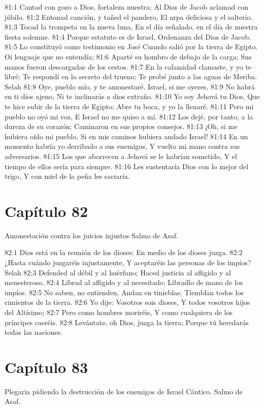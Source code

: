 81:1 Cantad con gozo a Dios, fortaleza nuestra; 
Al Dios de Jacob aclamad con júbilo. 
81:2 Entonad canción, y tañed el pandero, 
El arpa deliciosa y el salterio. 
81:3 Tocad la trompeta en la nueva luna, 
En el día señalado, en el día de nuestra fiesta solemne. 
81:4 Porque estatuto es de Israel, 
Ordenanza del Dios de Jacob. 
81:5 Lo constituyó como testimonio en José 
Cuando salió por la tierra de Egipto. 
Oí lenguaje que no entendía; 
81:6 Aparté su hombro de debajo de la carga; 
Sus manos fueron descargadas de los cestos. 
81:7 En la calamidad clamaste, y yo te libré; 
Te respondí en lo secreto del trueno; 
Te probé junto a las aguas de Meriba. Selah 
81:8 Oye, pueblo mío, y te amonestaré. 
Israel, si me oyeres, 
81:9 No habrá en ti dios ajeno, 
Ni te inclinarás a dios extraño. 
81:10 Yo soy Jehová tu Dios, 
Que te hice subir de la tierra de Egipto; 
Abre tu boca, y yo la llenaré. 
81:11 Pero mi pueblo no oyó mi voz, 
E Israel no me quiso a mí. 
81:12 Los dejé, por tanto, a la dureza de su corazón; 
Caminaron en sus propios consejos. 
81:13 ¡Oh, si me hubiera oído mi pueblo, 
Si en mis caminos hubiera andado Israel! 
81:14 En un momento habría yo derribado a sus enemigos, 
Y vuelto mi mano contra sus adversarios. 
81:15 Los que aborrecen a Jehová se le habrían sometido, 
Y el tiempo de ellos sería para siempre. 
81:16 Les sustentaría Dios con lo mejor del trigo, 
Y con miel de la peña les saciaría. 
\section*{Capítulo 82}
Amonestación contra los juicios injustos 
Salmo de Asaf. 
 
82:1 Dios está en la reunión de los dioses; 
En medio de los dioses juzga. 
82:2 ¿Hasta cuándo juzgaréis injustamente, 
Y aceptaréis las personas de los impíos? Selah 
82:3 Defended al débil y al huérfano; 
Haced justicia al afligido y al menesteroso. 
82:4 Librad al afligido y al necesitado; 
Libradlo de mano de los impíos. 
82:5 No saben, no entienden, 
Andan en tinieblas; 
Tiemblan todos los cimientos de la tierra. 
82:6 Yo dije: Vosotros sois dioses, 
Y todos vosotros hijos del Altísimo; 
82:7 Pero como hombres moriréis, 
Y como cualquiera de los príncipes caeréis. 
82:8 Levántate, oh Dios, juzga la tierra; 
Porque tú heredarás todas las naciones. 
\section*{Capítulo 83}
Plegaria pidiendo la destrucción de los enemigos de Israel 
Cántico. Salmo de Asaf. 
 
